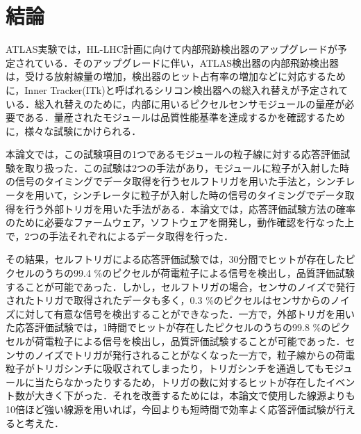 \chapter{結論}
ATLAS実験では，HL-LHC計画に向けて内部飛跡検出器のアップグレードが予定されている．そのアップグレードに伴い，ATLAS検出器の内部飛跡検出器は，受ける放射線量の増加，検出器のヒット占有率の増加などに対応するために，Inner Tracker(ITk)と呼ばれるシリコン検出器への総入れ替えが予定されている．総入れ替えのために，内部に用いるピクセルセンサモジュールの量産が必要である．量産されたモジュールは品質性能基準を達成するかを確認するために，様々な試験にかけられる．\par
本論文では，この試験項目の1つであるモジュールの粒子線に対する応答評価試験を取り扱った．この試験は2つの手法があり，モジュールに粒子が入射した時の信号のタイミングでデータ取得を行うセルフトリガを用いた手法と，シンチレータを用いて，シンチレータに粒子が入射した時の信号のタイミングでデータ取得を行う外部トリガを用いた手法がある．本論文では，応答評価試験方法の確率のために必要なファームウェア，ソフトウェアを開発し，動作確認を行なった上で，2つの手法それぞれによるデータ取得を行った．\par
その結果，セルフトリガによる応答評価試験では，30分間でヒットが存在したピクセルのうちの99.4 \%のピクセルが荷電粒子による信号を検出し，品質評価試験することが可能であった．しかし，セルフトリガの場合，センサのノイズで発行されたトリガで取得されたデータも多く，0.3 \%のピクセルはセンサからのノイズに対して有意な信号を検出することができなった．一方で，外部トリガを用いた応答評価試験では，1時間でヒットが存在したピクセルのうちの99.8 \%のピクセルが荷電粒子による信号を検出し，品質評価試験することが可能であった．センサのノイズでトリガが発行されることがなくなった一方で，粒子線からの荷電粒子がトリガシンチに吸収されてしまったり，トリガシンチを通過してもモジュールに当たらなかったりするため，トリガの数に対するヒットが存在したイベント数が大きく下がった．それを改善するためには，本論文で使用した線源よりも10倍ほど強い線源を用いれば，今回よりも短時間で効率よく応答評価試験が行えると考えた．

